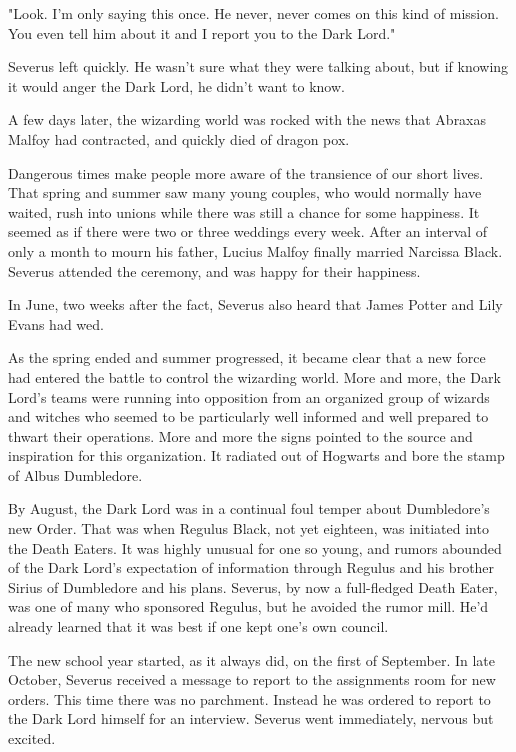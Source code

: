 \documentclass[a4paper,11pt]{article}
\begin{document}
"Look. I'm only saying this once. He never, never comes on this kind of mission. You even tell him about it and I report you to the Dark Lord."

Severus left quickly. He wasn't sure what they were talking about, but if knowing it would anger the Dark Lord, he didn't want to know.

A few days later, the wizarding world was rocked with the news that Abraxas Malfoy had contracted, and quickly died of dragon pox.

Dangerous times make people more aware of the transience of our short lives. That spring and summer saw many young couples, who would normally have waited, rush into unions while there was still a chance for some happiness. It seemed as if there were two or three weddings every week. After an interval of only a month to mourn his father, Lucius Malfoy finally married Narcissa Black. Severus attended the ceremony, and was happy for their happiness.

In June, two weeks after the fact, Severus also heard that James Potter and Lily Evans had wed.

As the spring ended and summer progressed, it became clear that a new force had entered the battle to control the wizarding world. More and more, the Dark Lord's teams were running into opposition from an organized group of wizards and witches who seemed to be particularly well informed and well prepared to thwart their operations. More and more the signs pointed to the source and inspiration for this organization. It radiated out of Hogwarts and bore the stamp of Albus Dumbledore.

By August, the Dark Lord was in a continual foul temper about Dumbledore's new Order. That was when Regulus Black, not yet eighteen, was initiated into the Death Eaters. It was highly unusual for one so young, and rumors abounded of the Dark Lord's expectation of information through Regulus and his brother Sirius of Dumbledore and his plans. Severus, by now a full-fledged Death Eater, was one of many who sponsored Regulus, but he avoided the rumor mill. He'd already learned that it was best if one kept one's own council.

The new school year started, as it always did, on the first of September. In late October, Severus received a message to report to the assignments room for new orders. This time there was no parchment. Instead he was ordered to report to the Dark Lord himself for an interview. Severus went immediately, nervous but excited.
\end{document}
